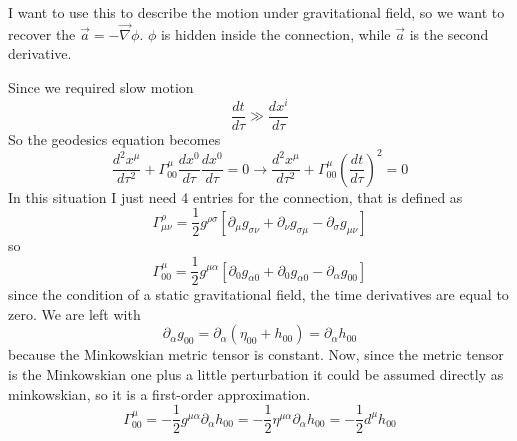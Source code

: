 I want to use this to describe the motion under gravitational field, so we want to recover the $\vec{a} = -\vec{\nabla } \phi $. $\phi $ is hidden inside the connection, while $\vec{a}$ is the second derivative. \par
Since we required slow motion 
\[
\frac{d t}{d \tau } \gg \frac{d x^{i}}{d \tau }	
\]
So the geodesics equation becomes
\begin{equation}
\frac{d ^{2}x^{\mu }}{d \tau ^{2}} + \Gamma ^{\mu }_{00}\frac{d x^{0}}{d \tau }\frac{d x^{0}}{d \tau } = 0 \to  \frac{d ^{2}x^{\mu }}{d \tau ^{2}} + \Gamma ^{\mu }_{00}\left( \frac{d t}{d \tau } \right)^{2} = 0
\end{equation}
In this situation I just need 4 entries for the connection, that is defined as
\[
	\Gamma ^{\rho }_{\mu \nu } = \frac{1}{2} g^{\rho \sigma }\left[ \partial_{\mu } g_{\sigma\nu } + \partial_{\nu }g_{\sigma \mu } - \partial_{\sigma }g_{\mu \nu } \right]
\]
so
\begin{equation}
	\Gamma ^{\mu }_{00} = \frac{1}{2} g^{\mu \alpha } \left[ \partial_{0}g_{\alpha 0} + \partial_{0}g_{\alpha 0} - \partial_{\alpha }g_{00} \right]
\end{equation}
since the condition of a static gravitational field, the time derivatives are equal to zero. We are left with 
\[
\partial_{\alpha }g_{00} = \partial_{\alpha }\left( \eta _{00} + h_{00} \right) = \partial_{\alpha }h_{00}
\]
because the Minkowskian metric tensor is constant.
Now, since the metric tensor is the Minkowskian one plus a little perturbation it could be
assumed directly as minkowskian, so it is a first-order approximation.
\begin{equation}
\Gamma ^{\mu }_{00} = -\frac{1}{2} g^{\mu \alpha } \partial_{\alpha }h_{00} = - \frac{1}{2}\eta ^{\mu \alpha } \partial_{\alpha }h_{00} = - \frac{1}{2} d^{\mu }h_{00}	
\end{equation}

